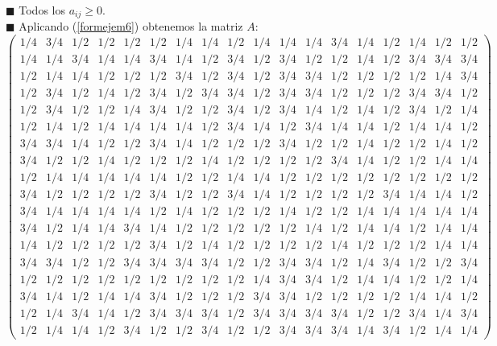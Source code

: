 	
	$\blacksquare $ Todos los $a_{ij} \geqslant 0$.\\
	
	$\blacksquare $ Aplicando (\ref{formejem6}) obtenemos la matriz $A$:\\
{\tiny 	\[
	\left(\begin{array}{cccccccccccccccccc}
	 1/4 & 3/4 & 1/2 & 1/2 & 1/2 & 1/2 & 1/4 & 1/4 & 1/2 & 1/4 & 1/4 & 1/4 & 3/4 & 1/4 & 1/2 & 1/4 & 1/2 & 1/2 \\
	 1/4 & 1/4 & 3/4 & 1/4 & 1/4 & 3/4 & 1/4 & 1/2 & 3/4 & 1/2 & 3/4 & 1/2 & 1/2 & 1/4 & 1/2 & 3/4 & 3/4 & 3/4 \\
	 1/2 & 1/4 & 1/4 & 1/2 & 1/2 & 1/2 & 3/4 & 1/2 & 3/4 & 1/2 & 3/4 & 3/4 & 1/2 & 1/2 & 1/2 & 1/2 & 1/4 & 3/4 \\
	 1/2 & 3/4 & 1/2 & 1/4 & 1/2 & 3/4 & 1/2 & 3/4 & 3/4 & 1/2 & 3/4 & 3/4 & 1/2 & 1/2 & 1/2 & 3/4 & 3/4 & 1/2 \\
	 1/2 & 3/4 & 1/2 & 1/2 & 1/4 & 3/4 & 1/2 & 1/2 & 3/4 & 1/2 & 3/4 & 1/4 & 1/2 & 1/4 & 1/2 & 3/4 & 1/2 & 1/4 \\
	 1/2 & 1/4 & 1/2 & 1/4 & 1/4 & 1/4 & 1/4 & 1/2 & 3/4 & 1/4 & 1/2 & 3/4 & 1/4 & 1/4 & 1/2 & 1/4 & 1/4 & 1/2 \\
	 3/4 & 3/4 & 1/4 & 1/2 & 1/2 & 3/4 & 1/4 & 1/2 & 1/2 & 1/2 & 3/4 & 1/2 & 1/2 & 1/4 & 1/2 & 1/2 & 1/4 & 1/2 \\
	 3/4 & 1/2 & 1/2 & 1/4 & 1/2 & 1/2 & 1/2 & 1/4 & 1/2 & 1/2 & 1/2 & 1/2 & 3/4 & 1/4 & 1/2 & 1/2 & 1/4 & 1/4 \\
	 1/2 & 1/4 & 1/4 & 1/4 & 1/4 & 1/4 & 1/2 & 1/2 & 1/4 & 1/4 & 1/2 & 1/2 & 1/2 & 1/2 & 1/2 & 1/2 & 1/2 & 1/2 \\
	 3/4 & 1/2 & 1/2 & 1/2 & 1/2 & 3/4 & 1/2 & 1/2 & 3/4 & 1/4 & 1/2 & 1/2 & 1/2 & 1/2 & 3/4 & 1/4 & 1/4 & 1/2 \\
	 3/4 & 1/4 & 1/4 & 1/4 & 1/4 & 1/2 & 1/4 & 1/2 & 1/2 & 1/2 & 1/4 & 1/2 & 1/2 & 1/4 & 1/4 & 1/4 & 1/4 & 1/4 \\
	 3/4 & 1/2 & 1/4 & 1/4 & 3/4 & 1/4 & 1/2 & 1/2 & 1/2 & 1/2 & 1/2 & 1/4 & 1/2 & 1/4 & 1/4 & 1/2 & 1/4 & 1/4 \\
	 1/4 & 1/2 & 1/2 & 1/2 & 1/2 & 3/4 & 1/2 & 1/4 & 1/2 & 1/2 & 1/2 & 1/2 & 1/4 & 1/2 & 1/2 & 1/2 & 1/4 & 1/4 \\
	 3/4 & 3/4 & 1/2 & 1/2 & 3/4 & 3/4 & 3/4 & 3/4 & 1/2 & 1/2 & 3/4 & 3/4 & 1/2 & 1/4 & 3/4 & 1/2 & 1/2 & 3/4 \\
	 1/2 & 1/2 & 1/2 & 1/2 & 1/2 & 1/2 & 1/2 & 1/2 & 1/2 & 1/4 & 3/4 & 3/4 & 1/2 & 1/4 & 1/4 & 1/2 & 1/2 & 1/4 \\
	 3/4 & 1/4 & 1/2 & 1/4 & 1/4 & 3/4 & 1/2 & 1/2 & 1/2 & 3/4 & 3/4 & 1/2 & 1/2 & 1/2 & 1/2 & 1/4 & 1/4 & 1/2 \\
	 1/2 & 1/4 & 3/4 & 1/4 & 1/2 & 3/4 & 3/4 & 3/4 & 1/2 & 3/4 & 3/4 & 3/4 & 3/4 & 1/2 & 1/2 & 3/4 & 1/4 & 3/4 \\
	 1/2 & 1/4 & 1/4 & 1/2 & 3/4 & 1/2 & 1/2 & 3/4 & 1/2 & 1/2 & 3/4 & 3/4 & 3/4 & 1/4 & 3/4 & 1/2 & 1/4 & 1/4 	
	 \end{array} \right) 
	\]}
	
